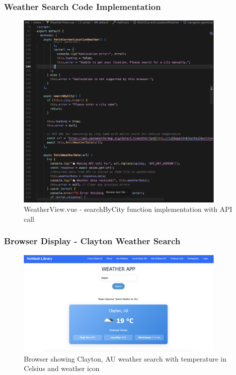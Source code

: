 \documentclass[12pt,a4paper]{article}
\begin{document}
\subsubsection{Weather Search Code Implementation}
\begin{figure}[H]
\centering
\includegraphics[width=0.9\textwidth]{weather_search_code.png}
\caption{WeatherView.vue - searchByCity function implementation with API call}
\end{figure}

\subsubsection{Browser Display - Clayton Weather Search}
\begin{figure}[H]
\centering
\includegraphics[width=0.9\textwidth]{clayton_weather_search.png}
\caption{Browser showing Clayton, AU weather search with temperature in Celsius and weather icon}
\end{figure}
\end{document}
